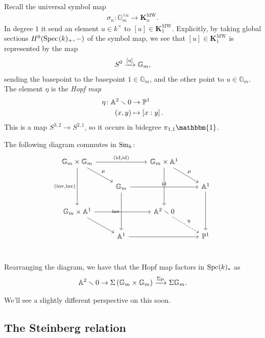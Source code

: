 \documentclass[11pt,openany]{book}
\let\smashprod\wedge
\providecommand{\KMW}{\mathbf{K}^\mathrm{MW}}
\begin{document}
Recall the universal symbol map
\begin{align*}
    \sigma_n \colon \mathbb{G}_m^{\smashprod n} \to \KMW_n.
\end{align*}
In degree $1$ it send an element $u \in k^\times$ to $[u]\in \KMW_1$. Explicitly, by taking global sections $H^0(\text{Spec}\hspace{0.1em}(k)_+,-)$ of the symbol map, we see that $[u]\in \KMW_1$ is represented by the map
\begin{align*}
    S^0 \xrightarrow{[u]} \mathbb{G}_m,
\end{align*}
sending the basepoint to the basepoint $1\in \mathbb{G}_m$, and the other point to $u \in \mathbb{G}_m$. The element $\eta$ is the \textit{Hopf map}
\begin{align*}
    \eta \colon \mathbb{A}^2\smallsetminus 0 &\to \mathbb{P}^1 \\
    (x,y) &\mapsto \left[ x:y \right].
\end{align*}
%
This is a map $S^{3,2} \to S^{2,1}$, so it occurs in bidegree $\pi_{1,1} \mathbbm{1}$.

\begin{proposition} The following diagram commutes in $\mathrm{Sm}_k$:
\[\begin{tikzcd}
    \mathbb{G}_m \times \mathbb{G}_m\ar[dr,"\mu"]\ar[rr,"{(\id,\id)}"]\ar[dd,"{(\inv,\inv)}" left] &  & \mathbb{G}_m \times \A^1\ar[dr,"\mu"]\ar[dd] & \\
     & \mathbb{G}_m\ar[dd,"\inv" left]\ar[rr,"\id"] &  & \A^1\ar[dd]\\
    \mathbb{G}_m \times \A^1\ar[dr]\ar[rr] &  & \A^2\minus 0\ar[dr,dashed,"\eta"] & \\
     & \A^1\ar[rr] &  & \P^1\\
\end{tikzcd} \]
\end{proposition}

\begin{corollary} Rearranging the diagram, we have that the Hopf map factors in $\mathrm{Spc}(k)_\ast$ as
\begin{equation}\label{eqn:hopf-factors}
\begin{aligned}
    \mathbb{A}^2 \smallsetminus 0 \to \Sigma \left( \mathbb{G}_m \times \mathbb{G}_m \right) \xrightarrow{\Sigma \mu} \Sigma \mathbb{G}_m.
\end{aligned}
\end{equation}
\end{corollary}

We'll see a slightly different perspective on this soon.

\subsection{The Steinberg relation}
\end{document}
